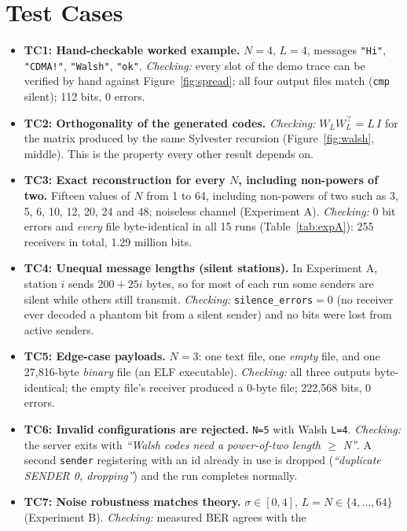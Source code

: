 \documentclass[11pt]{article}
\begin{document}
\section{Test Cases}
\begin{itemize}[leftmargin=1.6em]
  \item \textbf{TC1: Hand-checkable worked example.} $N=4$, $L=4$, messages
  \texttt{"Hi"}, \texttt{"CDMA!"}, \texttt{"Walsh"}, \texttt{"ok"}. \emph{Checking:}
  every slot of the demo trace can be verified by hand against Figure~\ref{fig:spread}; all
  four output files match (\texttt{cmp} silent); 112 bits, 0 errors.
  \item \textbf{TC2: Orthogonality of the generated codes.} \emph{Checking:}
  $W_L W_L^\top = L\,I$ for the matrix produced by the same Sylvester recursion
  (Figure~\ref{fig:walsh}, middle). This is the property every other result depends on.
  \item \textbf{TC3: Exact reconstruction for every $N$, including non-powers of two.}
  Fifteen values of $N$ from 1 to 64, including non-powers of two such as 3, 5, 6, 10, 12, 20,
  24 and 48; noiseless channel (Experiment A).
  \emph{Checking:} $0$ bit errors and \emph{every} file byte-identical in all 15 runs
  (Table~\ref{tab:expA}): 255 receivers in total, 1.29 million bits.
  \item \textbf{TC4: Unequal message lengths (silent stations).} In Experiment A, station
  $i$ sends $200+25i$ bytes, so for most of each run some senders are silent while others
  still transmit. \emph{Checking:} \texttt{silence\_errors}$=0$ (no receiver ever decoded a
  phantom bit from a silent sender) and no bits were lost from active senders.
  \item \textbf{TC5: Edge-case payloads.} $N=3$: one text file, one \emph{empty} file, and
  one 27{,}816-byte \emph{binary} file (an ELF executable). \emph{Checking:} all three outputs
  byte-identical; the empty file's receiver produced a 0-byte file; 222{,}568 bits, 0 errors.
  \item \textbf{TC6: Invalid configurations are rejected.} \texttt{N=5} with Walsh
  \texttt{L=4}. \emph{Checking:} the server exits with \emph{``Walsh codes need a
  power-of-two length $\ge$ N''}. A second \texttt{sender} registering with an id already in
  use is dropped (\emph{``duplicate SENDER 0, dropping''}) and the run completes normally.
  \item \textbf{TC7: Noise robustness matches theory.} $\sigma\in[0,4]$,
  $L=N\in\{4,\dots,64\}$ (Experiment B). \emph{Checking:} measured BER agrees with the

\end{itemize}
\end{document}
